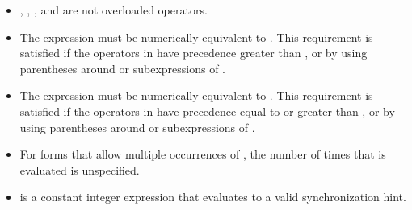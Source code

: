 \begin{ccppspecific}
\begin{itemize}
\item {}, \code{=}, \code{++}, and \code{--} are not overloaded operators.

\item The expression    must be numerically equivalent to
  . This
requirement is satisfied if the operators in  have precedence greater than ,
or by using parentheses around  or subexpressions of .

\item The expression    must be numerically equivalent to
  . This
requirement is satisfied if the operators in  have precedence equal to or greater
than , or by using parentheses around  or subexpressions of .

\item For forms that allow multiple occurrences of , the number of times that  is
evaluated is unspecified.

\item {} is a constant integer expression that evaluates to a valid synchronization
hint.
\end{itemize}

\end{ccppspecific}

